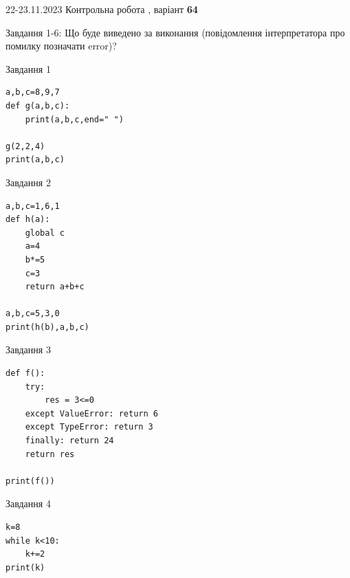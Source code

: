 \documentclass[12pt, ukrainian]{article}
\begin{document}
{{22-23.11.2023 Контрольна робота , варіант  \No \textbf { 64 }\par}}
{

Завдання 1-6: Що буде виведено за виконання (повідомлення інтерпретатора про помилку позначати error)?


\begin{minipage}[t]{9.7cm}                
{\begin{center}Завдання {1}\end{center}}
\begin{verbatim}
a,b,c=8,9,7
def g(a,b,c):
    print(a,b,c,end=" ")

g(2,2,4)
print(a,b,c)
\end{verbatim}     
\end{minipage}
\vline \hspace{8mm}
\begin{minipage}[t]{8.0cm}                
{\begin{center}Завдання {2}\end{center}}
\begin{verbatim}
a,b,c=1,6,1
def h(a):
    global c
    a=4
    b*=5
    c=3
    return a+b+c

a,b,c=5,3,0
print(h(b),a,b,c)
\end{verbatim}     
\end{minipage}

\vspace{15mm}
\begin{minipage}[t]{9.7cm}                
{\begin{center}Завдання {3}\end{center}}
\begin{verbatim}
def f():
    try:
        res = 3<=0
    except ValueError: return 6
    except TypeError: return 3
    finally: return 24
    return res

print(f())
\end{verbatim}     
\end{minipage}
\vline \hspace{8mm}
\begin{minipage}[t]{8.0cm}                
{\begin{center}Завдання {4}\end{center}}
\begin{verbatim}
k=8
while k<10:
    k+=2
print(k)
\end{verbatim}     
\end{minipage}

}
\end{document}
